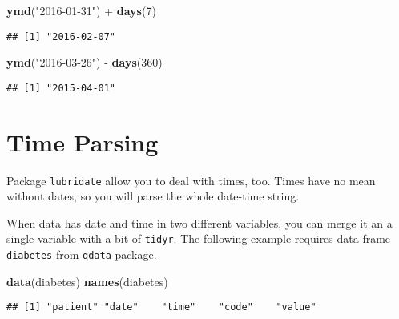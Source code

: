 \documentclass[]{book}
\newenvironment{Shaded}{\begin{snugshade}}{\end{snugshade}}
\newcommand{\KeywordTok}[1]{\textcolor[rgb]{0.13,0.29,0.53}{\textbf{{#1}}}}
\newcommand{\DecValTok}[1]{\textcolor[rgb]{0.00,0.00,0.81}{{#1}}}
\newcommand{\StringTok}[1]{\textcolor[rgb]{0.31,0.60,0.02}{{#1}}}
\newcommand{\NormalTok}[1]{{#1}}
\begin{document}
\begin{Shaded}
\begin{Highlighting}[]
\KeywordTok{ymd}\NormalTok{(}\StringTok{"2016-01-31"}\NormalTok{) +}\StringTok{ }\KeywordTok{days}\NormalTok{(}\DecValTok{7}\NormalTok{)}
\end{Highlighting}
\end{Shaded}

\begin{verbatim}
## [1] "2016-02-07"
\end{verbatim}

\begin{Shaded}
\begin{Highlighting}[]
\KeywordTok{ymd}\NormalTok{(}\StringTok{"2016-03-26"}\NormalTok{) -}\StringTok{ }\KeywordTok{days}\NormalTok{(}\DecValTok{360}\NormalTok{)}
\end{Highlighting}
\end{Shaded}

\begin{verbatim}
## [1] "2015-04-01"
\end{verbatim}

\section{Time Parsing}\label{time-parsing}

Package \texttt{lubridate} allow you to deal with times, too. Times have
no mean without dates, so you will parse the whole date-time string.

When data has date and time in two different variables, you can merge it
an a single variable with a bit of \texttt{tidyr}. The following example
requires data frame \texttt{diabetes} from \texttt{qdata} package.

\begin{Shaded}
\begin{Highlighting}[]
\KeywordTok{data}\NormalTok{(diabetes)}
\KeywordTok{names}\NormalTok{(diabetes)}
\end{Highlighting}
\end{Shaded}

\begin{verbatim}
## [1] "patient" "date"    "time"    "code"    "value"
\end{verbatim}

\begin{Shaded}
\end{Shaded}
\end{document}
